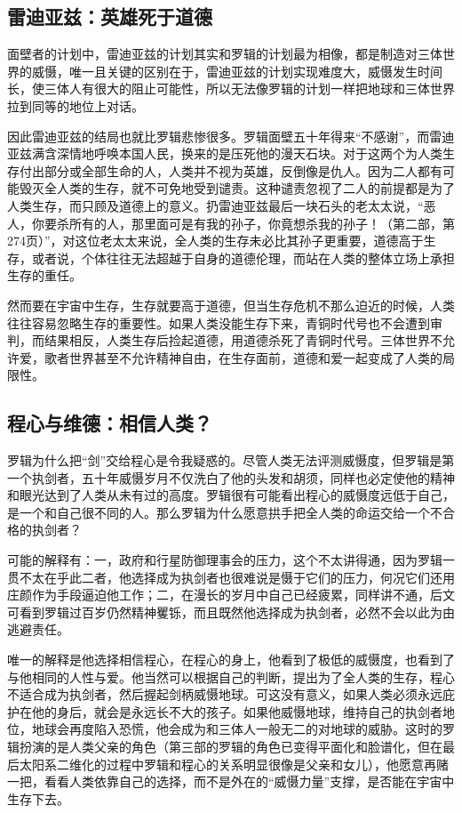 \documentclass[openany,scheme = chinese, linespread = 1.5]{ctexbook}
\begin{document}
\subsection*{雷迪亚兹：英雄死于道德}
面壁者的计划中，雷迪亚兹的计划其实和罗辑的计划最为相像，都是制造对三体世界的威慑，唯一且关键的区别在于，雷迪亚兹的计划实现难度大，威慑发生时间长，使三体人有很大的阻止可能性，所以无法像罗辑的计划一样把地球和三体世界拉到同等的地位上对话。

因此雷迪亚兹的结局也就比罗辑悲惨很多。罗辑面壁五十年得来“不感谢”，而雷迪亚兹满含深情地呼唤本国人民，换来的是压死他的漫天石块。对于这两个为人类生存付出部分或全部生命的人，人类并不视为英雄，反倒像是仇人。因为二人都有可能毁灭全人类的生存，就不可免地受到谴责。这种谴责忽视了二人的前提都是为了人类生存，而只顾及道德上的意义。扔雷迪亚兹最后一块石头的老太太说，“恶人，你要杀所有的人，那里面可是有我的孙子，你竟想杀我的孙子！（第二部，第274页）”，对这位老太太来说，全人类的生存未必比其孙子更重要，道德高于生存，或者说，个体往往无法超越于自身的道德伦理，而站在人类的整体立场上承担生存的重任。

然而要在宇宙中生存，生存就要高于道德，但当生存危机不那么迫近的时候，人类往往容易忽略生存的重要性。如果人类没能生存下来，青铜时代号也不会遭到审判，而结果相反，人类生存后捡起道德，用道德杀死了青铜时代号。三体世界不允许爱，歌者世界甚至不允许精神自由，在生存面前，道德和爱一起变成了人类的局限性。

\subsection*{程心与维德：相信人类？}

罗辑为什么把“剑”交给程心是令我疑惑的。尽管人类无法评测威慑度，但罗辑是第一个执剑者，五十年威慑岁月不仅洗白了他的头发和胡须，同样也必定使他的精神和眼光达到了人类从未有过的高度。罗辑很有可能看出程心的威慑度远低于自己，是一个和自己很不同的人。那么罗辑为什么愿意拱手把全人类的命运交给一个不合格的执剑者？

可能的解释有：一，政府和行星防御理事会的压力，这个不太讲得通，因为罗辑一贯不太在乎此二者，他选择成为执剑者也很难说是慑于它们的压力，何况它们还用庄颜作为手段逼迫他工作；二，在漫长的岁月中自己已经疲累，同样讲不通，后文可看到罗辑过百岁仍然精神矍铄，而且既然他选择成为执剑者，必然不会以此为由逃避责任。

唯一的解释是他选择相信程心，在程心的身上，他看到了极低的威慑度，也看到了与他相同的人性与爱。他当然可以根据自己的判断，提出为了全人类的生存，程心不适合成为执剑者，然后握起剑柄威慑地球。可这没有意义，如果人类必须永远庇护在他的身后，就会是永远长不大的孩子。如果他威慑地球，维持自己的执剑者地位，地球会再度陷入恐慌，他会成为和三体人一般无二的对地球的威胁。这时的罗辑扮演的是人类父亲的角色（第三部的罗辑的角色已变得平面化和脸谱化，但在最后太阳系二维化的过程中罗辑和程心的关系明显很像是父亲和女儿），他愿意再赌一把，看看人类依靠自己的选择，而不是外在的“威慑力量”支撑，是否能在宇宙中生存下去。
\end{document}
